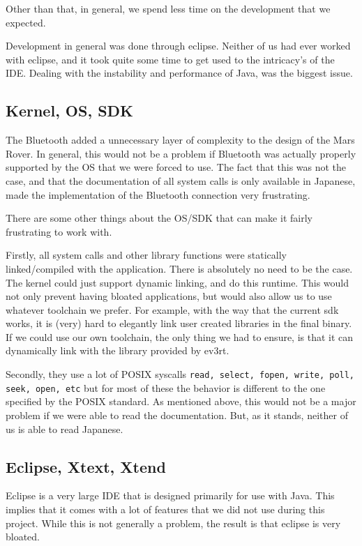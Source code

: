 \documentclass{scrartcl}
\begin{document}
Other than that, in general, we spend less time on the development that we expected.

Development in general was done through eclipse.
Neither of us had ever worked with eclipse, and it took quite some time to get used to the intricacy's of the IDE.
Dealing with the instability and performance of Java, was the biggest issue.

\subsection{Kernel, OS, SDK}
The Bluetooth added a unnecessary layer of complexity to the design of the Mars Rover.
In general, this would not be a problem if Bluetooth was actually properly supported by the OS that we were forced to use.
The fact that this was not the case, and that the documentation of all system calls is only available in Japanese, made the implementation of the Bluetooth connection very frustrating.

There are some other things about the OS/SDK that can make it fairly frustrating to work with.

Firstly, all system calls and other library functions were statically linked/compiled with the application.
There is absolutely no need to be the case.
The kernel could just support dynamic linking, and do this runtime.
This would not only prevent having bloated applications, but would also allow us to use whatever toolchain we prefer.
For example, with the way that the current sdk works, it is (very) hard to elegantly link user created libraries in the final binary.
If we could use our own toolchain, the only thing we had to ensure, is that it can dynamically link with the library provided by ev3rt.

Secondly, they use a lot of POSIX syscalls \texttt{read, select, fopen, write, poll, seek, open, etc} but for most of these the behavior is different to the one specified by the POSIX standard.
As mentioned above, this would not be a major problem if we were able to read the documentation.
But, as it stands, neither of us is able to read Japanese.

\subsection{Eclipse, Xtext, Xtend}
Eclipse is a very large IDE that is designed primarily for use with Java.
This implies that it comes with a lot of features that we did not use during this project.
While this is not generally a problem, the result is that eclipse is very bloated.
\end{document}

